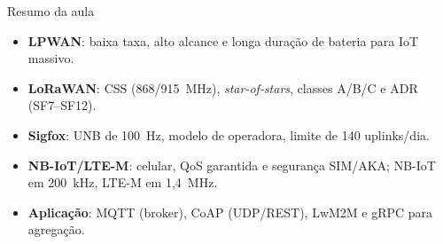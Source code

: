 \documentclass[aspectratio=169,11pt]{beamer}
\begin{document}
\begin{frame}{Resumo da aula}
  \begin{itemize}
    \item \textbf{LPWAN}: baixa taxa, alto alcance e longa duração de bateria para IoT massivo.
    \item \textbf{LoRaWAN}: CSS (868/915~MHz), \emph{star-of-stars}, classes A/B/C e ADR (SF7--SF12).
    \item \textbf{Sigfox}: UNB de 100~Hz, modelo de operadora, limite de 140 uplinks/dia.
    \item \textbf{NB-IoT/LTE-M}: celular, QoS garantida e segurança SIM/AKA; NB-IoT em 200~kHz, LTE-M em 1,4~MHz.
    \item \textbf{Aplicação}: MQTT (broker), CoAP (UDP/REST), LwM2M e gRPC para agregação.
  \end{itemize}
\end{frame}
\end{document}
